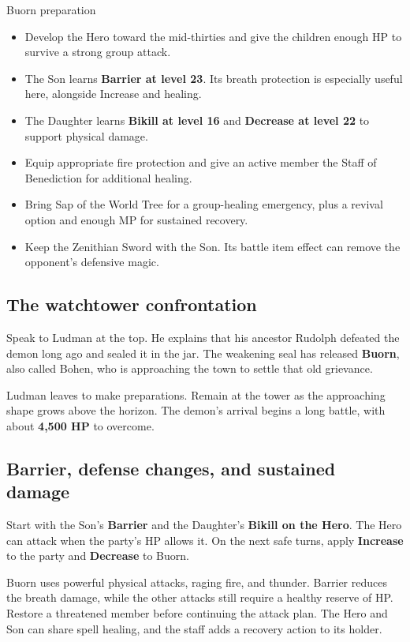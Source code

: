\begin{routecheck}{Buorn preparation}
\begin{itemize}
  \item Develop the Hero toward the mid-thirties and give the
    children enough HP to survive a strong group attack.
  \item The Son learns \textbf{Barrier at level 23}. Its breath
    protection is especially useful here, alongside Increase and healing.
  \item The Daughter learns \textbf{Bikill at level 16} and
    \textbf{Decrease at level 22} to support physical damage.
  \item Equip appropriate fire protection and give an active
    member the Staff of Benediction for additional healing.
  \item Bring Sap of the World Tree for a group-healing emergency,
    plus a revival option and enough MP for sustained recovery.
  \item Keep the Zenithian Sword with the Son. Its battle item
    effect can remove the opponent's defensive magic.
\end{itemize}
\end{routecheck}

\subsection*{The watchtower confrontation}

Speak to Ludman at the top. He explains that his ancestor
Rudolph defeated the demon long ago and sealed it in the jar.
The weakening seal has released \textbf{Buorn}, also called
Bohen, who is approaching the town to settle that old grievance.

Ludman leaves to make preparations. Remain at the tower as the
approaching shape grows above the horizon. The demon's arrival
begins a long battle, with about \textbf{4,500 HP} to overcome.

\subsection*{Barrier, defense changes, and sustained damage}

Start with the Son's \textbf{Barrier} and the Daughter's
\textbf{Bikill on the Hero}. The Hero can attack when the
party's HP allows it. On the next safe turns, apply
\textbf{Increase} to the party and \textbf{Decrease} to Buorn.

Buorn uses powerful physical attacks, raging fire, and thunder.
Barrier reduces the breath damage, while the other attacks still
require a healthy reserve of HP. Restore a threatened member
before continuing the attack plan. The Hero and Son can share
spell healing, and the staff adds a recovery action to its holder.

